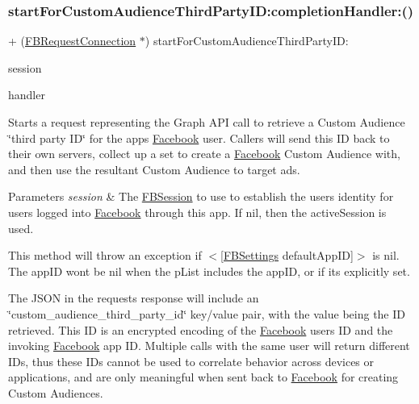 \subsubsection{\texorpdfstring{start\+For\+Custom\+Audience\+Third\+Party\+I\+D\+:completion\+Handler\+:()}{startForCustomAudienceThirdPartyID:completionHandler:()}\hspace{0.1cm}{\footnotesize\ttfamily [2/5]}}
{\footnotesize\ttfamily + (\hyperlink{interfaceFBRequestConnection}{F\+B\+Request\+Connection} $\ast$) start\+For\+Custom\+Audience\+Third\+Party\+I\+D\+: \begin{DoxyParamCaption}\item[{(\hyperlink{interfaceFBSession}{F\+B\+Session} $\ast$)}]{session }\item[{completionHandler:(F\+B\+Request\+Handler)}]{handler }\end{DoxyParamCaption}}

Starts a request representing the Graph A\+PI call to retrieve a Custom Audience \char`\"{}third party I\+D\char`\"{} for the app\textquotesingle{}s \hyperlink{interfaceFacebook}{Facebook} user. Callers will send this ID back to their own servers, collect up a set to create a \hyperlink{interfaceFacebook}{Facebook} Custom Audience with, and then use the resultant Custom Audience to target ads.


\begin{DoxyParams}{Parameters}
{\em session} & The \hyperlink{interfaceFBSession}{F\+B\+Session} to use to establish the user\textquotesingle{}s identity for users logged into \hyperlink{interfaceFacebook}{Facebook} through this app. If {\ttfamily nil}, then the active\+Session is used.\\
\hline
\end{DoxyParams}
This method will throw an exception if $<$\mbox{[}\hyperlink{interfaceFBSettings}{F\+B\+Settings} default\+App\+ID\mbox{]}$>$ is {\ttfamily nil}. The app\+ID won\textquotesingle{}t be nil when the p\+List includes the app\+ID, or if it\textquotesingle{}s explicitly set.

The J\+S\+ON in the request\textquotesingle{}s response will include an \char`\"{}custom\+\_\+audience\+\_\+third\+\_\+party\+\_\+id\char`\"{} key/value pair, with the value being the ID retrieved. This ID is an encrypted encoding of the \hyperlink{interfaceFacebook}{Facebook} user\textquotesingle{}s ID and the invoking \hyperlink{interfaceFacebook}{Facebook} app ID. Multiple calls with the same user will return different I\+Ds, thus these I\+Ds cannot be used to correlate behavior across devices or applications, and are only meaningful when sent back to \hyperlink{interfaceFacebook}{Facebook} for creating Custom Audiences.

